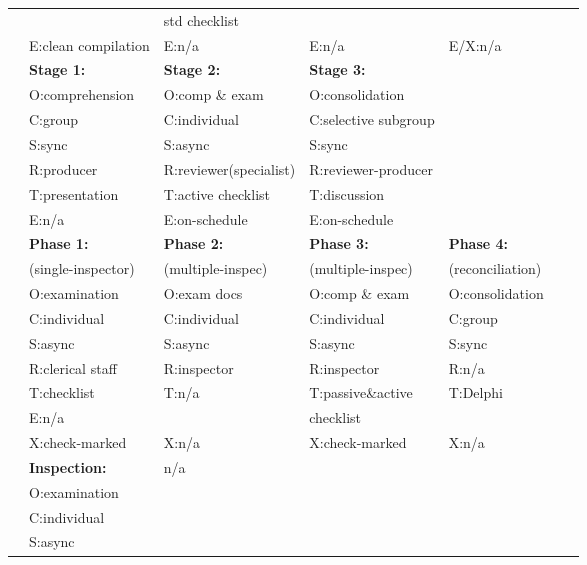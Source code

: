 \begin{table}[tb]
\begin{center}
\begin{tabular}{|l|l|l|l|l|l|l|}
              &                   & std checklist    &                   &              &\\
              & E:clean compilation & E:n/a            & E:n/a               & E/X:n/a          &\\
\hline
[Parnas,85]   & {\bf Stage 1:}   & {\bf Stage 2:}   & {\bf Stage 3:}     &  & \\
              & O:comprehension & O:comp \& exam    & O:consolidation  &  & \\
              & C:group         & C:individual      & C:selective subgroup & &\\
              & S:sync          & S:async           & S:sync            & &\\
              & R:producer      & R:reviewer(specialist)& R:reviewer-producer & &\\
              & T:presentation  & T:active checklist & T:discussion    &  & \\
              & E:n/a             & E:on-schedule     & E:on-schedule    & &\\
\hline
[Knight,93] & {\bf Phase 1:}    & {\bf Phase 2:}    & {\bf Phase 3:}   & {\bf Phase 4:}   & \\
           & (single-inspector) & (multiple-inspec) & (multiple-inspec) & (reconciliation) & \\
            & O:examination      & O:exam docs     & O:comp \& exam & O:consolidation & \\
            & C:individual       & C:individual       & C:individual    & C:group & \\
            & S:async            & S:async            & S:async         & S:sync &\\
            & R:clerical staff   & R:inspector       & R:inspector      & R:n/a &\\
            & T:checklist        & T:n/a               & T:passive\&active & T:Delphi      & \\
            & E:n/a                &                   & checklist        &  &\\
            & X:check-marked   & X:n/a               & X:check-marked  & X:n/a &\\
\hline
[Dyer,92]   & {\bf Inspection:} & n/a & & & \\
            & O:examination     &  & & & \\
            & C:individual      &  & & & \\
            & S:async           &  & & & \\

\end{tabular}
\end{center}
\end{table}
